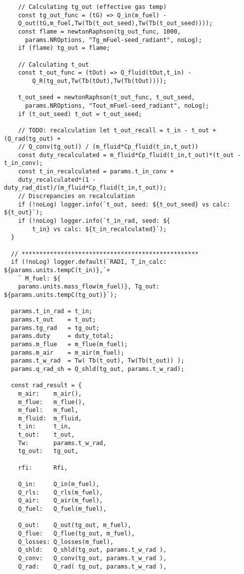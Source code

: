 \begin{verbatim}
    // Calculating tg_out (effective gas temp)
    const tg_out_func = (tG) => Q_in(m_fuel) -
    Q_out(tG,m_fuel,Tw(Tb(t_out_seed),Tw(Tb(t_out_seed))));
    const flame = newtonRaphson(tg_out_func, 1000, 
      params.NROptions, "Tg_mFuel-seed_radiant", noLog);
    if (flame) tg_out = flame;

    // Calculating t_out 
    const t_out_func = (tOut) => Q_fluid(tOut,t_in) -
        Q_R(tg_out,Tw(Tb(tOut),Tw(Tb(tOut))));

    t_out_seed = newtonRaphson(t_out_func, t_out_seed, 
      params.NROptions, "Tout_mFuel-seed_radiant", noLog);
    if (t_out_seed) t_out = t_out_seed;

    // TODO: recalculation let t_out_recall = t_in - t_out + (Q_rad(tg_out) + 
    // Q_conv(tg_out)) / (m_fluid*Cp_fluid(t_in,t_out))
    const duty_recalculated = m_fluid*Cp_fluid(t_in,t_out)*(t_out -t_in_conv);
    const t_in_recalculated = params.t_in_conv + 
    duty_recalculated*(1 -duty_rad_dist)/(m_fluid*Cp_fluid(t_in,t_out));  
    // Discrepancies on recalculation
    if (!noLog) logger.info(`t_out, seed: ${t_out_seed} vs calc: ${t_out}`);
    if (!noLog) logger.info(`t_in_rad, seed: ${
        t_in} vs calc: ${t_in_recalculated}`);
  }

  // **************************************************
  if (!noLog) logger.default(`RADI, T_in_calc: ${params.units.tempC(t_in)},`+
    ` M_fuel: ${
    params.units.mass_flow(m_fuel)}, Tg_out: ${params.units.tempC(tg_out)}`);

  params.t_in_rad = t_in;
  params.t_out    = t_out;
  params.tg_rad   = tg_out;
  params.duty     = duty_total;
  params.m_flue   = m_flue(m_fuel);
  params.m_air    = m_air(m_fuel);
  params.t_w_rad  = Tw( Tb(t_out), Tw(Tb(t_out)) );
  params.q_rad_sh = Q_shld(tg_out, params.t_w_rad);

  const rad_result = {
    m_air:    m_air(),
    m_flue:   m_flue(),
    m_fuel:   m_fuel,
    m_fluid:  m_fluid,
    t_in:     t_in,
    t_out:    t_out,
    Tw:       params.t_w_rad,
    tg_out:   tg_out,

    rfi:      Rfi,

    Q_in:     Q_in(m_fuel),
    Q_rls:    Q_rls(m_fuel),
    Q_air:    Q_air(m_fuel),
    Q_fuel:   Q_fuel(m_fuel),
    
    Q_out:    Q_out(tg_out, m_fuel),
    Q_flue:   Q_flue(tg_out, m_fuel),
    Q_losses: Q_losses(m_fuel),
    Q_shld:   Q_shld(tg_out, params.t_w_rad ),
    Q_conv:   Q_conv(tg_out, params.t_w_rad ),
    Q_rad:    Q_rad( tg_out, params.t_w_rad ),


\end{verbatim}
